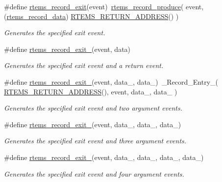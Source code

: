 \begin{DoxyCompactItemize}
\#define \mbox{\hyperlink{group__RTEMSRecord_ga84bdc088fc28829caee88f45cb205842}{rtems\+\_\+record\+\_\+exit}}(event)~\mbox{\hyperlink{group__RTEMSRecord_ga136d81367324d6729819192181ea68bb}{rtems\+\_\+record\+\_\+produce}}( event, (\mbox{\hyperlink{group__RTEMSRecord_gab483bd3ec735835dac6788b78c817eab}{rtems\+\_\+record\+\_\+data}}) \mbox{\hyperlink{group__RTEMSScoreBaseDefs_ga70a1b8869a1ec49d30613af22ebc3f50}{R\+T\+E\+M\+S\+\_\+\+R\+E\+T\+U\+R\+N\+\_\+\+A\+D\+D\+R\+E\+SS}}() )
\begin{DoxyCompactList}\small\item\em Generates the specified exit event. \end{DoxyCompactList}\item 
\#define \mbox{\hyperlink{group__RTEMSRecord_gaabaa22fa377d623f85646e5103cfb396}{rtems\+\_\+record\+\_\+exit\+\_}}(event,  data)
\begin{DoxyCompactList}\small\item\em Generates the specified exit event and a return event. \end{DoxyCompactList}\item 
\#define \mbox{\hyperlink{group__RTEMSRecord_ga104394ba0089e16dd5a807ab019d9bf4}{rtems\+\_\+record\+\_\+exit\+\_}}(event,  data\+\_,  data\+\_)~\+\_\+\+Record\+\_\+\+Entry\+\_( \mbox{\hyperlink{group__RTEMSScoreBaseDefs_ga70a1b8869a1ec49d30613af22ebc3f50}{R\+T\+E\+M\+S\+\_\+\+R\+E\+T\+U\+R\+N\+\_\+\+A\+D\+D\+R\+E\+SS}}(), event, data\+\_, data\+\_ )
\begin{DoxyCompactList}\small\item\em Generates the specified exit event and two argument events. \end{DoxyCompactList}\item 
\#define \mbox{\hyperlink{group__RTEMSRecord_gafd984b8a6cd700ee440e2d86a987bfb3}{rtems\+\_\+record\+\_\+exit\+\_}}(event,  data\+\_,  data\+\_,  data\+\_)
\begin{DoxyCompactList}\small\item\em Generates the specified exit event and three argument events. \end{DoxyCompactList}\item 
\#define \mbox{\hyperlink{group__RTEMSRecord_ga26173e74d454599746b62f210aea7454}{rtems\+\_\+record\+\_\+exit\+\_}}(event,  data\+\_,  data\+\_,  data\+\_,  data\+\_)
\begin{DoxyCompactList}\small\item\em Generates the specified exit event and four argument events. \end{DoxyCompactList}\item 

\end{DoxyCompactItemize}
